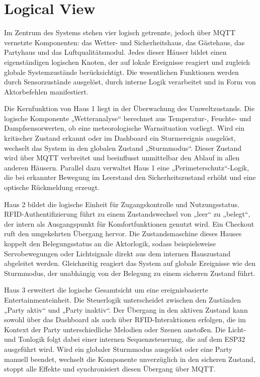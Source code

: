 \section{Logical View}
Im Zentrum des Systems stehen vier logisch getrennte, jedoch über MQTT vernetzte Komponenten: das Wetter- und Sicherheitshaus, das Gästehaus, das Partyhaus und das Luftqualitätsmodul. Jedes dieser Häuser bildet einen eigenständigen logischen Knoten, der auf lokale Ereignisse reagiert und zugleich globale Systemzustände berücksichtigt. Die wesentlichen Funktionen werden durch Sensorzustände ausgelöst, durch interne Logik verarbeitet und in Form von Aktorbefehlen manifestiert.

Die Kernfunktion von Haus 1 liegt in der Überwachung des Umweltzustands. Die logische Komponente „Wetteranalyse“ berechnet aus Temperatur-, Feuchte- und Dampfsensorwerten, ob eine meteorologische Warnsituation vorliegt. Wird ein kritischer Zustand erkannt oder im Dashboard ein Sturmereignis ausgelöst, wechselt das System in den globalen Zustand „Sturmmodus“. Dieser Zustand wird über MQTT verbreitet und beeinflusst unmittelbar den Ablauf in allen anderen Häusern. Parallel dazu verwaltet Haus 1 eine „Perimeterschutz“-Logik, die bei erkannter Bewegung im Leerstand den Sicherheitszustand erhöht und eine optische Rückmeldung erzeugt.

Haus 2 bildet die logische Einheit für Zugangskontrolle und Nutzungsstatus. RFID-Authentifizierung führt zu einem Zustandswechsel von „leer“ zu „belegt“, der intern als Ausgangspunkt für Komfortfunktionen genutzt wird. Ein Checkout ruft den umgekehrten Übergang hervor. Die Zustandsmaschine dieses Hauses koppelt den Belegungsstatus an die Aktorlogik, sodass beispielsweise Servobewegungen oder Lichtsignale direkt aus dem internen Hauszustand abgeleitet werden. Gleichzeitig reagiert das System auf globale Ereignisse wie den Sturmmodus, der unabhängig von der Belegung zu einem sicheren Zustand führt.

Haus 3 erweitert die logische Gesamtsicht um eine ereignisbasierte Entertainmenteinheit. Die Steuerlogik unterscheidet zwischen den Zuständen „Party aktiv“ und „Party inaktiv“. Der Übergang in den aktiven Zustand kann sowohl über das Dashboard als auch über RFID-Interaktionen erfolgen, die im Kontext der Party unterschiedliche Melodien oder Szenen anstoßen. Die Licht- und Tonlogik folgt dabei einer internen Sequenzsteuerung, die auf dem ESP32 ausgeführt wird. Wird ein globaler Sturmmodus ausgelöst oder eine Party manuell beendet, wechselt die Komponente unverzüglich in den sicheren Zustand, stoppt alle Effekte und synchronisiert diesen Übergang über MQTT.

